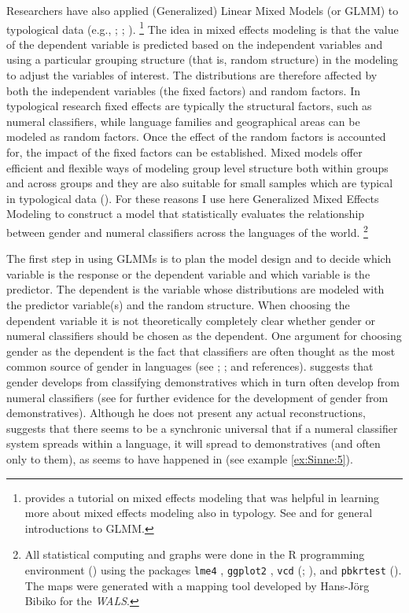 \documentclass[output=collectionpaper]{langsci/langscibook}
\begin{document}
Researchers have also applied (Generalized) Linear Mixed Models (or GLMM) to typological data (e.g., \citealt{Cysouw2010}; \citealt{Jaeger2011}; \citealt{Bentz2013}).%
\footnote{\citet{Winter2013} provides a tutorial on mixed effects modeling that was helpful in learning more about mixed effects modeling also in typology. See \citet{Breslow1993} and \citet{Gelman2007} for general introductions to GLMM.} %
The idea in mixed effects modeling is that the value of the dependent variable is predicted based on the independent variables and using a particular grouping structure (that is, random structure) in the modeling to adjust the variables of interest. The distributions are therefore affected by both the independent variables (the fixed factors) and random factors. In typological research fixed effects are typically the structural factors, such as numeral classifiers, while language families and geographical areas can be modeled as random factors. Once the effect of the random factors is accounted for, the impact of the fixed factors can be established. Mixed models offer efficient and flexible ways of modeling group level structure both within groups and across groups and they are also suitable for small samples which are typical in typological data (\citealt[289--290]{Jaeger2011}). For these reasons I use here Generalized Mixed Effects Modeling to construct a model that statistically evaluates the relationship between gender and numeral classifiers across the languages of the world.%
\footnote{All statistical computing and graphs were done in the R programming environment (\citealt{RCT2017}) using the packages \texttt{lme4} \citep{Bates2015}, \texttt{ggplot2} \citep{Wickham2009}, \texttt{vcd} (\citealt{Meyer2006,Meyer2015}; \citealt{Zeileis2007}), and \texttt{pbkrtest} (\citealt{Halekoh2014}). The maps were generated with a mapping tool developed by Hans-Jörg Bibiko for the \textit{WALS}.}

The first step in using GLMMs is to plan the model design and to decide which variable is the response or the dependent variable and which variable is the predictor. The dependent is the variable whose distributions are modeled with the predictor variable(s) and the random structure. When choosing the dependent variable it is not theoretically completely clear whether gender or numeral classifiers should be chosen as the dependent. One argument for choosing gender as the dependent is the fact that classifiers are often thought as the most common source of gender in languages (see \citealt[136]{Corbett1991}; \citealt[727--728]{Seifart2010}; \citealt[450--452]{Luraghi2011} and references). \citet[78--79]{Greenberg1978} suggests that gender develops from classifying demonstratives which in turn often develop from numeral classifiers (see \citealt[341--342]{Harris1995} for further evidence for the development of gender from demonstratives). Although he does not present any actual reconstructions, \citet[35--36]{Greenberg1972} suggests that there seems to be a synchronic universal that if a numeral classifier system spreads within a language, it will spread to demonstratives (and often only to them), as seems to have happened in  (see example \ref{ex:Sinne:5}).
\end{document}
